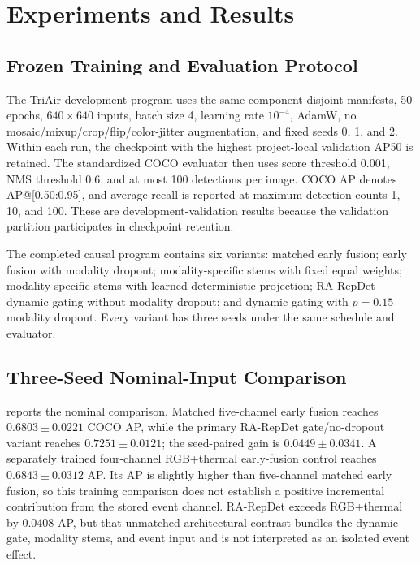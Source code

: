 \section{Experiments and Results}
\subsection{Frozen Training and Evaluation Protocol}
The TriAir development program uses the same component-disjoint manifests, 50 epochs, $640\times640$ inputs, batch size 4, learning rate $10^{-4}$, AdamW, no mosaic/mixup/crop/flip/color-jitter augmentation, and fixed seeds 0, 1, and 2. Within each run, the checkpoint with the highest project-local validation AP50 is retained. The standardized COCO evaluator then uses score threshold 0.001, NMS threshold 0.6, and at most 100 detections per image. COCO AP denotes AP@[0.50:0.95], and average recall is reported at maximum detection counts 1, 10, and 100. These are development-validation results because the validation partition participates in checkpoint retention.

The completed causal program contains six variants: matched early fusion; early fusion with modality dropout; modality-specific stems with fixed equal weights; modality-specific stems with learned deterministic projection; RA-RepDet dynamic gating without modality dropout; and dynamic gating with $p=0.15$ modality dropout. Every variant has three seeds under the same schedule and evaluator.

\subsection{Three-Seed Nominal-Input Comparison}
 reports the nominal comparison. Matched five-channel early fusion reaches $0.6803\pm0.0221$ COCO AP, while the primary RA-RepDet gate/no-dropout variant reaches $0.7251\pm0.0121$; the seed-paired gain is $0.0449\pm0.0341$. A separately trained four-channel RGB+thermal early-fusion control reaches $0.6843\pm0.0312$ AP. Its AP is slightly higher than five-channel matched early fusion, so this training comparison does not establish a positive incremental contribution from the stored event channel. RA-RepDet exceeds RGB+thermal by 0.0408 AP, but that unmatched architectural contrast bundles the dynamic gate, modality stems, and event input and is not interpreted as an isolated event effect.

